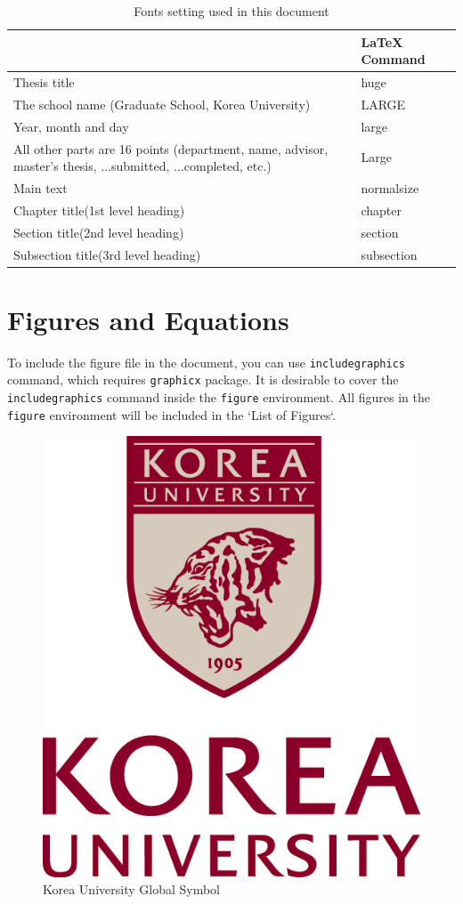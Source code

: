 \documentclass[11pt]{report}
\numberwithin{figure}{section}
\theoremstyle{plain}
\theoremstyle{definition}
\theoremstyle{corollary}
\theoremstyle{definition}
\theoremstyle{plain}
\theoremstyle{definition}
\theoremstyle{plain}
\begin{document}

\begin{table}\centering
\caption{Fonts setting used in this document}
\vspace{0.5cm}
\begin{tabular}{  m{9cm}  m{3cm} }
\hline
               &     \LaTeX{} Command \\\hline 
Thesis title	& huge \\
The school name (Graduate School, Korea University) & LARGE \\
Year, month and day	& large\\
All other parts are 16 points (department, name, advisor, master's thesis, ...submitted, ...completed, etc.)	& Large\\
Main text & normalsize	\\
Chapter title(1st level heading)   & chapter \\
Section title(2nd level heading)  & section \\
Subsection title(3rd level heading) & subsection \\\hline

\end{tabular}
\end{table}



\newpage
\section{Figures and Equations}\label{sec:figures_and_equations}

To include the figure file in the document, you can use \texttt{includegraphics} command, which requires \texttt{graphicx} package.
It is desirable to cover the \texttt{includegraphics} command inside the \texttt{figure} environment.
All figures in the \texttt{figure} environment will be included in the `List of Figures`.

\begin{figure}[h]
\begin{center}
\includegraphics[width=.2\textwidth]{kumark.png}
\end{center}
\caption{Korea University Global Symbol}
\end{figure}
\end{document}
